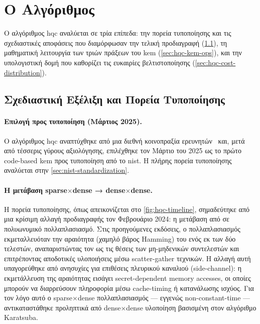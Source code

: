 \section{Ο Αλγόριθμος \HQC}
\label{sec:hqc-algorithm}

Ο αλγόριθμος \gls{hqc} αναλύεται σε τρία επίπεδα: την
πορεία τυποποίησης και τις σχεδιαστικές αποφάσεις που διαμόρφωσαν την τελική
προδιαγραφή (\cref{sec:hqc-standardization}), τη μαθηματική λειτουργία των τριών πράξεων του \gls{kem} (\cref{sec:hqc-kem-ops}), και την υπολογιστική δομή που καθορίζει
τις ευκαιρίες βελτιστοποίησης (\cref{sec:hqc-cost-distribution}).


\subsection{Σχεδιαστική Εξέλιξη και Πορεία Τυποποίησης}
\label{sec:hqc-standardization}

\paragraph{Επιλογή προς τυποποίηση (Μάρτιος 2025).}
Ο αλγόριθμος \gls{hqc} αναπτύχθηκε από μια διεθνή κοινοπραξία ερευνητών~\cite{HQC-spec2024} και, μετά από τέσσερις γύρους αξιολόγησης, επιλέχθηκε τον Μάρτιο του 2025 ως το πρώτο code-based \gls{kem} προς τυποποίηση από το \gls{nist}. Η πλήρης πορεία τυποποίησης αναλύεται στην \cref{sec:nist-standardization}.

\paragraph{Η μετάβαση sparse$\times$dense → dense$\times$dense.}
Η πορεία τυποποίησης, όπως απεικονίζεται στο \cref{fig:hqc-timeline}, σημαδεύτηκε
από μια κρίσιμη αλλαγή προδιαγραφής τον Φεβρουάριο 2024: η μετάβαση από
 σε  πολυωνυμικό
πολλαπλασιασμό.
Στις προηγούμενες εκδόσεις, ο πολλαπλασιασμός εκμεταλλευόταν την αραιότητα
(χαμηλό βάρος Hamming) του ενός εκ των δύο τελεστών, αναπαριστώντας τον ως τις θέσεις των μη-μηδενικών
συντελεστών και επιτρέποντας αποδοτικές υλοποιήσεις μέσω scatter-gather τεχνικών.
Η αλλαγή αυτή υπαγορεύθηκε από ανησυχίες για επιθέσεις πλευρικού καναλιού (side-channel): η εκμετάλλευση της αραιότητας εισάγει secret-dependent memory accesses, οι οποίες μπορούν να διαρρεύσουν πληροφορία μέσω cache-timing ή κατανάλωσης ισχύος.
Για τον λόγο αυτό ο sparse$\times$dense πολλαπλασιασμός --- εγγενώς
non-constant-time --- αντικαταστάθηκε προληπτικά από dense$\times$dense υλοποίηση
βασισμένη στον αλγόριθμο Karatsuba.

